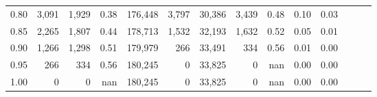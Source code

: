 \begin{tabular}{rrrrrrrrrrrrrr}
0.80 &   3,091 &  1,929 &  0.38 &  176,448 &    3,797 &  30,386 &   3,439 &  0.48 &  0.10 &      0.03 \\
0.85 &   2,265 &  1,807 &  0.44 &  178,713 &    1,532 &  32,193 &   1,632 &  0.52 &  0.05 &      0.01 \\
0.90 &   1,266 &  1,298 &  0.51 &  179,979 &      266 &  33,491 &     334 &  0.56 &  0.01 &      0.00 \\
0.95 &     266 &    334 &  0.56 &  180,245 &        0 &  33,825 &       0 &   nan &  0.00 &      0.00 \\
1.00 &       0 &      0 &   nan &  180,245 &        0 &  33,825 &       0 &   nan &  0.00 &      0.00 \\
\bottomrule
\end{tabular}

